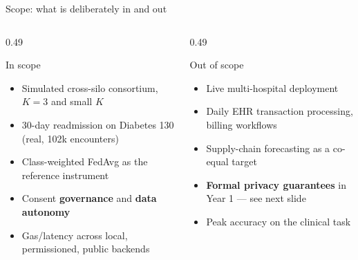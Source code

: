 \documentclass[aspectratio=169, 11pt]{beamer}
\begin{document}
\begin{frame}{Scope: what is deliberately in and out}
\small
\begin{columns}[T]
\begin{column}{0.49\textwidth}
\begin{exampleblock}{In scope}
\begin{itemize}\small
\item Simulated cross-silo consortium, $K{=}3$ and small $K$
\item 30-day readmission on Diabetes 130 (real, 102k encounters)
\item Class-weighted FedAvg as the reference instrument
\item Consent \textbf{governance} and \textbf{data autonomy}
\item Gas/latency across local, permissioned, public backends
\end{itemize}
\end{exampleblock}
\end{column}
\begin{column}{0.49\textwidth}
\begin{block}{Out of scope}
\begin{itemize}\small
\item Live multi-hospital deployment
\item Daily EHR transaction processing, billing workflows
\item Supply-chain forecasting as a co-equal target
\item \textbf{Formal privacy guarantees} in Year 1 --- see next slide
\item Peak accuracy on the clinical task
\end{itemize}
\end{block}
\end{column}
\end{columns}
\end{frame}
\end{document}
